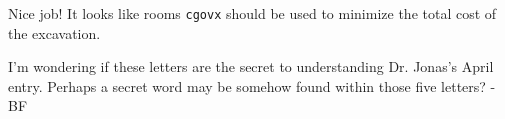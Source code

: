 Nice job! It looks like rooms \texttt{cgovx} should be used to
minimize the total cost of the excavation.

I'm wondering if these letters are the secret to understanding
Dr. Jonas's April entry. Perhaps a secret word may be somehow
found within those five letters? -BF
